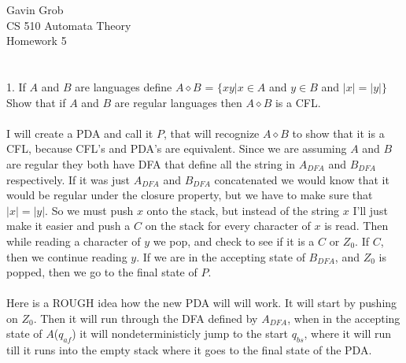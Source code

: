 \documentclass[11pt, oneside]{article}   	%
\begin{document}
\noindent Gavin Grob
\\CS 510 Automata Theory
\\Homework 5
\\
\\
\\1. If $A$ and $B$ are languages define $A \diamond B$ = $\{xy | x \in A$ and $y \in B$ and $| x | = | y | \}$
\\Show that if $A$ and $B$ are regular languages then $A  \diamond  B$ is a CFL.
\\
\\I will create a PDA and call it $P$, that will recognize $A \diamond B$ to show that it is a CFL, because CFL's and PDA's are equivalent. Since we are assuming $A$ and $B$ are regular they both have DFA that define all the string in $A_{DFA}$ and $B_{DFA}$ respectively. If it was just $A_{DFA}$ and $B_{DFA}$ concatenated we would know that it would be regular under the closure property, but we have to make sure that $| x | = | y |$. So we must push $x$ onto the stack, but instead of the string $x$ I'll just make it easier and push a $C$ on the stack for every character of $x$ is read. Then while reading a character of $y$ we pop, and check to see if it is a $C$ or $Z_0$. If $C$, then we continue reading $y$. If we are in the accepting state of $B_{DFA}$, and $Z_0$ is popped, then we go to the final state of $P$.
\\
\\Here is a ROUGH idea how the new PDA will will work. It will start by pushing on $Z_0$. Then it will run through the DFA defined by $A_{DFA}$, when in the accepting state of $A$($q_{af}$) it will nondeterministicly jump to the start $q_{bs}$, where it will run till it runs into the empty stack where it goes to the final state of the PDA.
\\
\end{document}
